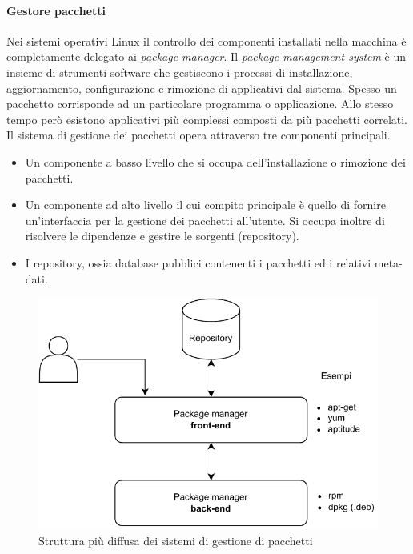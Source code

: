 \documentclass[12pt,a4paper,openright,twoside]{book}
\begin{document}
\paragraph{Gestore pacchetti} Nei sistemi operativi Linux il controllo dei componenti installati nella macchina è completamente delegato ai \textit{package manager}. Il \textit{package-management system} è un insieme di strumenti software che gestiscono i processi di installazione, aggiornamento, configurazione e rimozione di applicativi dal sistema. Spesso un pacchetto corrisponde ad un particolare programma o applicazione. Allo stesso tempo però esistono applicativi più complessi composti da più pacchetti correlati. Il sistema di gestione dei pacchetti opera attraverso tre componenti principali.

\begin{itemize}
	\item Un componente a basso livello che si occupa dell'installazione o rimozione dei pacchetti.
	\item Un componente ad alto livello il cui compito principale è quello di fornire un'interfaccia per la gestione dei pacchetti all'utente. Si occupa inoltre di risolvere le dipendenze e gestire le sorgenti (repository).
	\item I repository, ossia database pubblici contenenti i pacchetti ed i relativi meta-dati.
\end{itemize}

\begin{figure}[H]
	\centering
	\includegraphics[width=.7\linewidth]{figures/package-managers.pdf}
	\caption{Struttura più diffusa dei sistemi di gestione di pacchetti}
	\label{fig:package-managers}
\end{figure}
\end{document}
